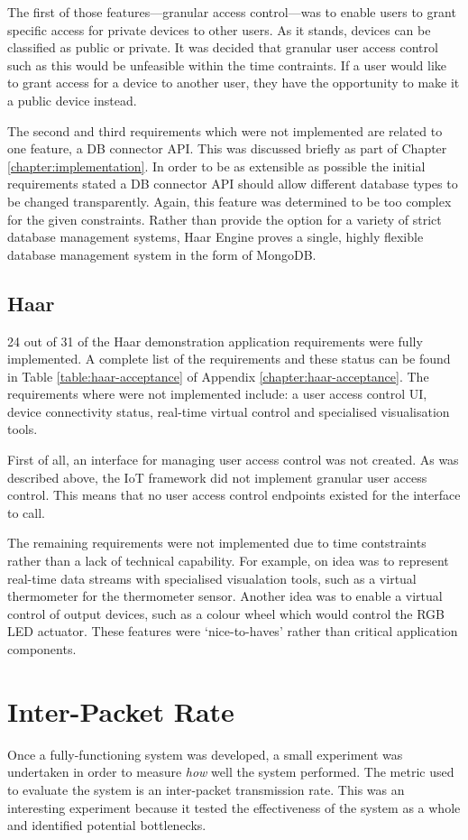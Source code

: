       The first of those features---granular access control---was to enable users to grant specific access for private devices to other users. As it stands, devices can be classified as public or private. It was decided that granular user access control such as this would be unfeasible within the time contraints. If a user would like to grant access for a device to another user, they have the opportunity to make it a public device instead.

      The second and third requirements which were not implemented are related to one feature, a DB connector API. This was discussed briefly as part of Chapter \ref{chapter:implementation}. In order to be as extensible as possible the initial requirements stated a DB connector API should allow different database types to be changed transparently. Again, this feature was determined to be too complex for the given constraints. Rather than provide the option for a variety of strict database management systems, Haar Engine proves a single, highly flexible database management system in the form of MongoDB.

    \subsection{Haar}
      24 out of 31 of the Haar demonstration application requirements were fully implemented. A complete list of the requirements and these status can be found in Table \ref{table:haar-acceptance} of Appendix \ref{chapter:haar-acceptance}. The requirements where were not implemented include: a user access control UI, device connectivity status, real-time virtual control and specialised visualisation tools.

      First of all, an interface for managing user access control was not created. As was described above, the IoT framework did not implement granular user access control. This means that no user access control endpoints existed for the interface to call.

      The remaining requirements were not implemented due to time contstraints rather than a lack of technical capability. For example, on idea was to represent real-time data streams with specialised visualation tools, such as a virtual thermometer for the thermometer sensor. Another idea was to enable a virtual control of output devices, such as a colour wheel which would control the RGB LED actuator. These features were `nice-to-haves' rather than critical application components.

  \section{Inter-Packet Rate}
    Once a fully-functioning system was developed, a small experiment was undertaken in order to measure \textit{how} well the system performed. The metric used to evaluate the system is an inter-packet transmission rate. This was an interesting experiment because it tested the effectiveness of the system as a whole and identified potential bottlenecks.

